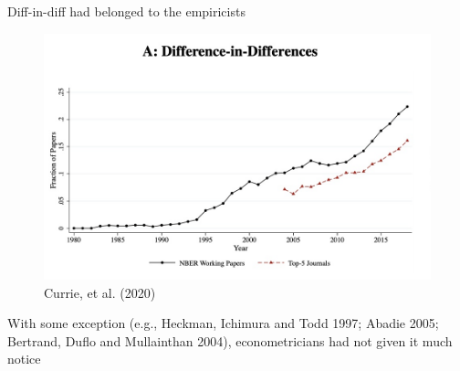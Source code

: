 \documentclass{beamer}
\begin{document}
\begin{frame}{Diff-in-diff had belonged to the empiricists}

	\begin{figure}
	\caption{Currie, et al. (2020)}
	\includegraphics[scale=0.25]{./lecture_includes/currie_did.png}
	\end{figure}

\bigskip

\footnotesize

With some exception (e.g., Heckman, Ichimura and Todd 1997; Abadie 2005; Bertrand, Duflo and Mullainthan 2004), econometricians had not given it much notice

\end{frame}
\end{document}

